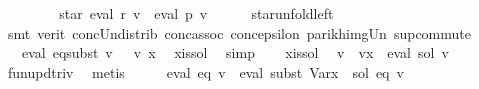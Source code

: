 \begin{isabellebody}
\ \ \isamarkupfalse%
\ \isamarkupfalse%
\ {\isachardoublequoteopen}{\isasymdots}\ {\isacharequal}{\kern0pt}\ {\isasymPsi}\ {\isacharparenleft}{\kern0pt}star\ {\isacharparenleft}{\kern0pt}eval\ {\isacharquery}{\kern0pt}r\ v{\isacharparenright}{\kern0pt}\ {\isacharat}{\kern0pt}{\isacharat}{\kern0pt}\ eval\ p\ v{\isacharparenright}{\kern0pt}{\isachardoublequoteclose}\isanewline
\ \ \ \ \isamarkupfalse%
\ star{\isacharunderscore}{\kern0pt}unfold{\isacharunderscore}{\kern0pt}left\isanewline
\ \ \ \ \isamarkupfalse%
\ {\isacharparenleft}{\kern0pt}smt\ {\isacharparenleft}{\kern0pt}verit{\isacharparenright}{\kern0pt}\ conc{\isacharunderscore}{\kern0pt}Un{\isacharunderscore}{\kern0pt}distrib{\isacharparenleft}{\kern0pt}{}{\isacharparenright}{\kern0pt}\ conc{\isacharunderscore}{\kern0pt}assoc\ conc{\isacharunderscore}{\kern0pt}epsilon{\isacharparenleft}{\kern0pt}{}{\isacharparenright}{\kern0pt}\ parikh{\isacharunderscore}{\kern0pt}img{\isacharunderscore}{\kern0pt}Un\ sup{\isacharunderscore}{\kern0pt}commute{\isacharparenright}{\kern0pt}\isanewline
\ \ \isamarkupfalse%
\ \isamarkupfalse%
\ {\isacharasterisk}{\kern0pt}{\isacharcolon}{\kern0pt}\ {\isachardoublequoteopen}{\isasymPsi}\ {\isacharparenleft}{\kern0pt}eval\ {\isacharquery}{\kern0pt}eq{\isacharunderscore}{\kern0pt}subst\ v{\isacharparenright}{\kern0pt}\ {\isasymsubseteq}\ {\isasymPsi}\ {\isacharparenleft}{\kern0pt}v\ x{\isacharparenright}{\kern0pt}{\isachardoublequoteclose}\ \isamarkupfalse%
\ x{\isacharunderscore}{\kern0pt}is{\isacharunderscore}{\kern0pt}sol\ \isamarkupfalse%
\ simp\isanewline
\ \ \isamarkupfalse%
\ x{\isacharunderscore}{\kern0pt}is{\isacharunderscore}{\kern0pt}sol\ \isamarkupfalse%
\ {\isachardoublequoteopen}v\ {\isacharequal}{\kern0pt}\ v{\isacharparenleft}{\kern0pt}x\ {\isacharcolon}{\kern0pt}{\isacharequal}{\kern0pt}\ eval\ sol\ v{\isacharparenright}{\kern0pt}{\isachardoublequoteclose}\ \isamarkupfalse%
\ fun{\isacharunderscore}{\kern0pt}upd{\isacharunderscore}{\kern0pt}triv\ \isamarkupfalse%
\ metis\isanewline
\ \ \isamarkupfalse%
\ \isamarkupfalse%
\ {\isachardoublequoteopen}eval\ eq\ v\ {\isacharequal}{\kern0pt}\ eval\ {\isacharparenleft}{\kern0pt}subst\ {\isacharparenleft}{\kern0pt}Var{\isacharparenleft}{\kern0pt}x\ {\isacharcolon}{\kern0pt}{\isacharequal}{\kern0pt}\ sol{\isacharparenright}{\kern0pt}{\isacharparenright}{\kern0pt}\ eq{\isacharparenright}{\kern0pt}\ v{\isachardoublequoteclose}\isanewline

\end{isabellebody}
